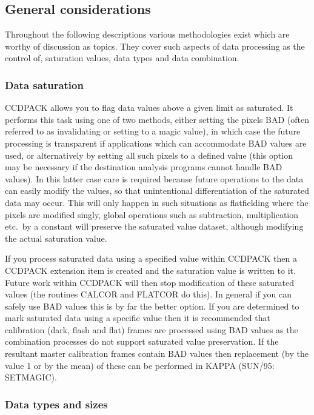 \documentclass[twoside,11pt]{article}
\newcommand{\htmlref}[2]{#1}
\newcommand{\xref}[3]{#1}
\newcommand{\xlabel}[1]{}
\renewcommand{\_}{\texttt{\symbol{95}}}
\newcommand{\xroutine}[1]{\htmlref{{\sc #1}}{#1}}
\begin{document}
\subsection{General considerations}

Throughout the following descriptions various methodologies exist which are
worthy of discussion as topics. They cover such aspects of data processing as
the control of, saturation values, data types and data combination.

\subsubsection{Data saturation \xlabel{CCDsaturate}}

CCDPACK allows you to flag data values above a given
limit as saturated. It performs this task using one of two methods,
either setting the pixels BAD (often referred to as invalidating or
setting to a magic value), in which case the future processing is
transparent if applications which can accommodate BAD values are used,
or alternatively by setting all such pixels to a defined value (this
option may be necessary if the destination analysis programs cannot
handle BAD values). In this latter case care is required because future
operations to the data can easily modify the values, so that
unintentional differentiation of the saturated data may occur. This will
only happen in such situations as flatfielding where the pixels are
modified singly, global operations such as subtraction, multiplication
etc.\ by a constant will preserve the saturated value dataset, although
modifying the actual saturation value.

If you process saturated data using a specified value within CCDPACK
then a CCDPACK extension item is created and the saturation value is
written to it. Future work within CCDPACK will then stop modification of
these saturated values (the routines \xroutine{CALCOR} and \xroutine{FLATCOR} do this). In
general if you can safely use BAD values this is by far the better
option. If you are determined to mark saturated data using a specific
value then it is recommended that calibration (dark, flash and flat)
frames are processed using BAD values as the combination processes
do not support saturated value preservation. If the resultant master
calibration frames contain BAD values then replacement (by the value 1
or by the mean) of these can be performed in KAPPA
(SUN/95: \xref{SETMAGIC}{sun95}{}).

\subsubsection{Data types and sizes}
\end{document}
